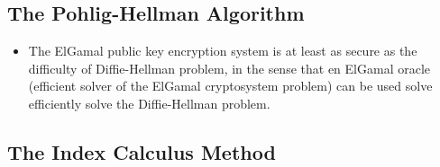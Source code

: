 \subsection{The Pohlig-Hellman Algorithm}

\begin{itemize}
\item	The ElGamal public key encryption system is at least as secure as the difficulty of Diffie-Hellman problem,
		in the sense that en ElGamal oracle (efficient solver of the ElGamal cryptosystem problem) can be used
		solve efficiently solve the Diffie-Hellman problem.
\end{itemize}

\subsection{The Index Calculus Method}



